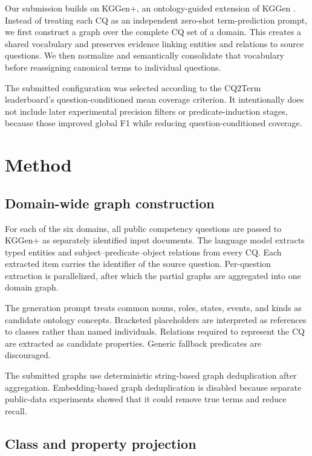 \documentclass{ceurart}
\begin{document}
Our submission builds on KGGen+, an ontology-guided extension of KGGen
\cite{kggen}. Instead of treating each CQ as an independent zero-shot
term-prediction prompt, we first construct a graph over the complete CQ set of
a domain. This creates a shared vocabulary and preserves evidence linking
entities and relations to source questions. We then normalize and semantically
consolidate that vocabulary before reassigning canonical terms to individual
questions.

The submitted configuration was selected according to the CQ2Term
leaderboard's question-conditioned mean coverage criterion. It intentionally
does not include later experimental precision filters or predicate-induction
stages, because those improved global F1 while reducing question-conditioned
coverage.

\section{Method}

\subsection{Domain-wide graph construction}

For each of the six domains, all public competency questions are passed to
KGGen+ as separately identified input documents. The language model extracts
typed entities and subject--predicate--object relations from every CQ. Each
extracted item carries the identifier of the source question. Per-question
extraction is parallelized, after which the partial graphs are aggregated into
one domain graph.

The generation prompt treats common nouns, roles, states, events, and kinds as
candidate ontology concepts. Bracketed placeholders are interpreted as
references to classes rather than named individuals. Relations required to
represent the CQ are extracted as candidate properties. Generic fallback
predicates are discouraged.

The submitted graphs use deterministic string-based graph deduplication after
aggregation. Embedding-based graph deduplication is disabled because separate
public-data experiments showed that it could remove true terms and reduce
recall.

\subsection{Class and property projection}
\end{document}
